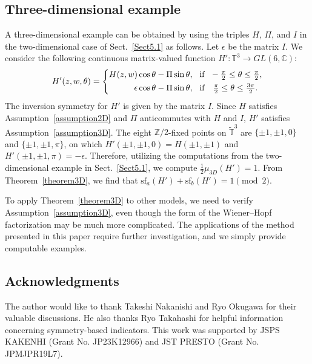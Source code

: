 \documentclass{amsart}
\theoremstyle{plain}
\theoremstyle{definition}
\theoremstyle{remark}
\newcommand{\Z}{\mathbb{Z}}
\newcommand{\C}{\mathbb{C}}
\newcommand{\T}{\mathbb{T}}
\newcommand{\tT}{\widetilde{\T}}
\renewcommand{\sf}{\mathrm{sf}}
\begin{document}
\subsection{Three-dimensional example}
\label{Sect5.2}
A three-dimensional example can be obtained by using the triples $H$, $\Pi$, and $I$ in the two-dimensional case of Sect.~\ref{Sect5.1} as follows.
Let $\epsilon$ be the matrix $I$.
We consider the following continuous matrix-valued function $H' \colon \T^3 \to GL(6,\C)$:
\begin{equation*}
H'(z, w, \theta) =
\left\{
\begin{aligned}
	H(z, w) \cos \theta - \Pi \sin \theta, & \hspace{3mm} \text{if} \ \ -\tfrac{\pi}{2} \leq \theta \leq \tfrac{\pi}{2},\\
	\epsilon \cos \theta - \Pi \sin \theta, & \hspace{3mm} \text{if} \ \ \ \tfrac{\pi}{2} \leq \theta \leq \tfrac{3\pi}{2}.
\end{aligned}
\right.
\end{equation*}
The inversion symmetry for $H'$ is given by the matrix $I$.
Since $H$ satisfies Assumption~\ref{assumption2D} and $\Pi$ anticommutes with $H$ and $I$, $H'$ satisfies Assumption~\ref{assumption3D}.
The eight $\Z/2$-fixed points on $\tT^3$ are $\{ \pm1, \pm1, 0 \}$ and $\{ \pm 1, \pm1, \pi \}$, on which $H'(\pm 1, \pm1, 0) = H(\pm1, \pm1)$ and $H'(\pm 1, \pm1, \pi) = -\epsilon$.
Therefore, utilizing the computations from the two-dimensional example in Sect.~\ref{Sect5.1}, we compute $\frac{1}{2}\mu_{3D}(H') = 1$.
From Theorem~\ref{theorem3D}, we find that $\sf_a(H') + \sf_b(H') = 1 \pmod 2$.

To apply Theorem~\ref{theorem3D} to other models, we need to verify Assumption~\ref{assumption3D}, even though the form of the Wiener--Hopf factorization may be much more complicated.
The applications of the method presented in this paper require further investigation, and we simply provide computable examples.


\subsection*{Acknowledgments}

The author would like to thank Takeshi Nakanishi and Ryo Okugawa for their valuable discussions.
He also thanks Ryo Takahashi for helpful information concerning symmetry-based indicators.
This work was supported by JSPS KAKENHI (Grant No. JP23K12966) and JST PRESTO (Grant No. JPMJPR19L7).
\end{document}
